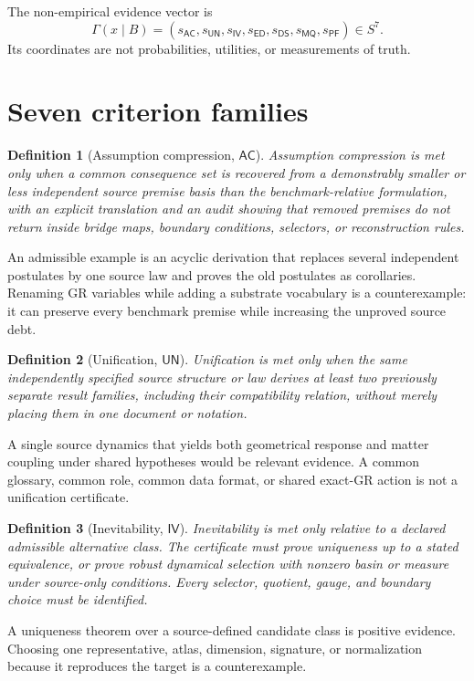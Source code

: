 \documentclass[11pt]{article}
\newtheorem{definition}{Definition}
\newcommand{\AC}{\mathsf{AC}}
\newcommand{\UN}{\mathsf{UN}}
\newcommand{\IV}{\mathsf{IV}}
\newcommand{\ED}{\mathsf{ED}}
\newcommand{\DS}{\mathsf{DS}}
\newcommand{\MQ}{\mathsf{MQ}}
\newcommand{\PF}{\mathsf{PF}}
\begin{document}
The non-empirical evidence vector is
\[
 \Gamma(x\mid B)=
 (s_{\AC},s_{\UN},s_{\IV},s_{\ED},s_{\DS},s_{\MQ},s_{\PF})\in S^7.
\]
Its coordinates are not probabilities, utilities, or measurements of truth.

\section{Seven criterion families}

\begin{definition}[Assumption compression, \(\AC\)]
Assumption compression is met only when a common consequence set is recovered
from a demonstrably smaller or less independent source premise basis than the
benchmark-relative formulation, with an explicit translation and an audit
showing that removed premises do not return inside bridge maps, boundary
conditions, selectors, or reconstruction rules.
\end{definition}
An admissible example is an acyclic derivation that replaces several
independent postulates by one source law and proves the old postulates as
corollaries.  Renaming GR variables while adding a substrate vocabulary is a
counterexample: it can preserve every benchmark premise while increasing the
unproved source debt.

\begin{definition}[Unification, \(\UN\)]
Unification is met only when the same independently specified source
structure or law derives at least two previously separate result families,
including their compatibility relation, without merely placing them in one
document or notation.
\end{definition}
A single source dynamics that yields both geometrical response and matter
coupling under shared hypotheses would be relevant evidence.  A common
glossary, common role, common data format, or shared exact-GR action is not a
unification certificate.

\begin{definition}[Inevitability, \(\IV\)]
Inevitability is met only relative to a declared admissible alternative class.
The certificate must prove uniqueness up to a stated equivalence, or prove
robust dynamical selection with nonzero basin or measure under source-only
conditions.  Every selector, quotient, gauge, and boundary choice must be
identified.
\end{definition}
A uniqueness theorem over a source-defined candidate class is positive
evidence.  Choosing one representative, atlas, dimension, signature, or
normalization because it reproduces the target is a counterexample.
\end{document}
